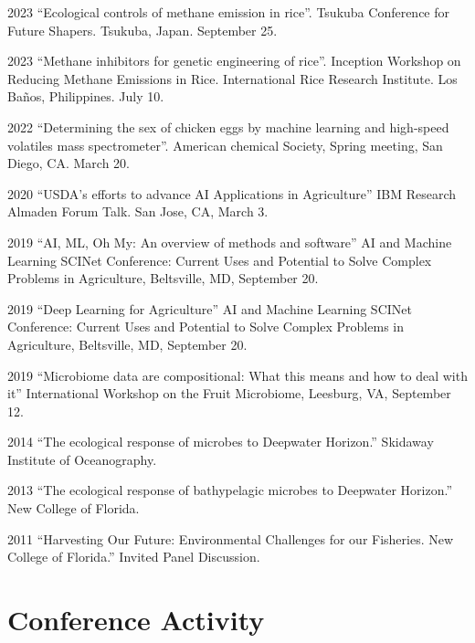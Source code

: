\documentclass[12pt,letterpaper]{report}
\begin{document}
    \begin{tablist}
    	\item[2023 ] \tab \enquote{Ecological controls of methane emission in rice}. Tsukuba Conference for Future Shapers.  Tsukuba, Japan. September 25.
    	\item[2023 ] \tab \enquote{Methane inhibitors for genetic engineering of rice}. Inception Workshop on Reducing Methane Emissions in Rice. International Rice Research Institute. Los Ba\~{n}os, Philippines. July 10.
    	\item[2022] \tab \enquote{Determining the sex of chicken eggs by machine learning and high-speed volatiles mass spectrometer}. American chemical Society, Spring meeting, San Diego, CA. March 20.
    	\item[2020] \tab \enquote{USDA's efforts to advance AI Applications in Agriculture} IBM Research Almaden Forum Talk. San Jose, CA,  March 3.

        \item[2019] \tab \enquote{AI, ML, Oh My: An overview of methods and software}  AI and Machine Learning SCINet Conference:  Current Uses and Potential to Solve Complex Problems in Agriculture, Beltsville, MD, September 20.
        
        \item[2019] \tab \enquote{Deep Learning for Agriculture} AI and Machine Learning SCINet Conference:  Current Uses and Potential to Solve Complex Problems in Agriculture,  Beltsville, MD, September 20.
        
        \item[2019] \tab \enquote{Microbiome data are compositional: What this means and how to deal with it} International Workshop on the Fruit Microbiome,  Leesburg, VA, September 12.
        \item[2014] \tab \enquote{The ecological response of microbes to Deepwater Horizon.} Skidaway Institute of Oceanography. 
        \item[2013] \tab \enquote{The ecological response of bathypelagic microbes to Deepwater Horizon.} New College of Florida.
        \item[2011] \tab \enquote{Harvesting Our Future: Environmental Challenges for our Fisheries. New College of Florida.} Invited Panel Discussion.


        
       \end{tablist}

  
    \section*{Conference Activity}
\end{document}

